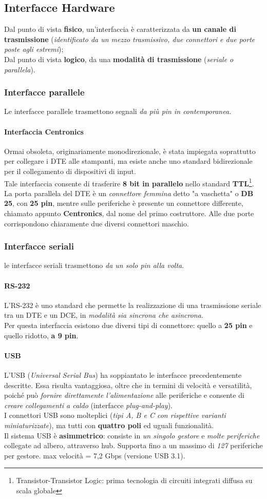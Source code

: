 \documentclass[a4paper,11pt]{article}
\def\subsub#1{\subsubsection{#1}\label{#1}}
\def\para#1{\paragraph{#1}\label{#1}}
\def\italic#1{\textit{#1}}
\begin{document}
\subsection{Interfacce Hardware}
Dal punto di vista \textbf{fisico}, un'interfaccia è caratterizzata da \textbf{un canale di trasmissione} (\textit{identificato da un mezzo trasmissivo, due connettori e due porte poste agli estremi}); \\Dal punto di vista \textbf{logico}, da una \textbf{modalità di trasmissione} (\textit{seriale o parallela}). 
\subsub{Interfacce parallele}
Le interfacce parallele trasmettono segnali \textit{da più pin in contemporanea.}
\para{Interfaccia Centronics}
Ormai obsoleta, originariamente monodirezionale, è stata impiegata soprattutto per collegare i DTE alle stampanti, ma esiste anche uno standard bidirezionale per il collegamento di dispositivi di input.\\
Tale interfaccia consente di trasferire \textbf{8 bit in parallelo }nello standard \textbf{TTL}\footnote{Transistor-Transistor Logic: prima tecnologia di circuiti integrati diffusa su scala globale}.\\
La porta parallela del DTE è un \textit{connettore femmina }detto "a vaschetta" o \textbf{DB 25}, con \textbf{25 pin}, mentre sulle periferiche è presente un connettore differente, chiamato appunto \textbf{Centronics}, dal nome del primo costruttore. Alle due porte corrispondono chiaramente due diversi connettori maschio.
\subsub{Interfacce seriali}
le interfacce seriali trasmettono \textit{da un solo pin alla volta}.
\para{RS-232}
L'RS-232 è uno standard che permette la realizzazione di una trasmissione seriale tra un DTE e un DCE, in \textit{modalità sia sincrona che asincrona}. \\Per questa interfaccia esistono due diversi tipi di connettore: quello a \textbf{25 pin }e quello ridotto, \textbf{a 9 pin}.
\para{USB}
L'USB (\textit{Universal Serial Bus}) ha soppiantato le interfacce precedentemente descritte. Essa risulta vantaggiosa, oltre che in termini di velocità e versatilità, poiché può \textit{fornire direttamente l'alimentazione }alle periferiche e consente di \textit{creare }\italic{collegamenti a caldo} (interfacce \textit{plug-and-play}).\\
I connettori USB sono molteplici (\textit{tipi A, B e C con rispettive varianti miniaturizzate}), ma tutti con \textbf{quattro poli }ed uguali funzionalità.\\
Il sistema USB è \textbf{asimmetrico}: consiste in \textit{un singolo gestore }e \textit{molte periferiche }collegate ad albero, attraverso  hub. Supporta fino a un massimo di \textit{127 }periferiche per gestore. max velocità = 7,2 Gbps (versione USB 3.1).
\end{document}
